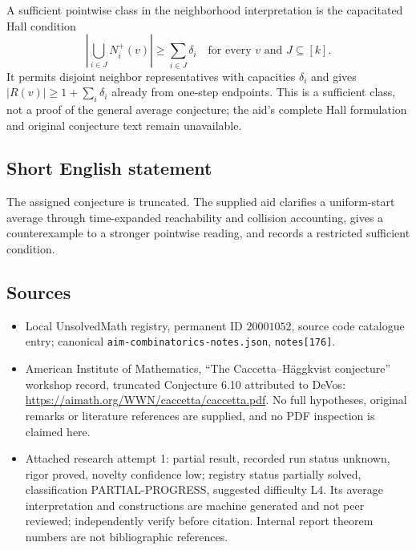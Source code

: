 \documentclass[11pt]{article}
\begin{document}
A sufficient pointwise class in the neighborhood interpretation is the capacitated Hall condition
\[
\left|\bigcup_{i\in J}N_i^+(v)\right|\ge\sum_{i\in J}\delta_i
\quad\text{for every }v\text{ and }J\subseteq[k].
\]
It permits disjoint neighbor representatives with capacities $\delta_i$ and gives $|R(v)|\ge1+\sum_i\delta_i$ already from one-step endpoints. This is a sufficient class, not a proof of the general average conjecture; the aid's complete Hall formulation and original conjecture text remain unavailable.
\subsection{Short English statement}
The assigned conjecture is truncated. The supplied aid clarifies a uniform-start average through time-expanded reachability and collision accounting, gives a counterexample to a stronger pointwise reading, and records a restricted sufficient condition.
\subsection{Sources}
\begin{itemize}
\item Local UnsolvedMath registry, permanent ID $20001052$, source code catalogue entry; canonical \texttt{aim-combinatorics-notes.json}, \texttt{notes[176]}.
\item American Institute of Mathematics, ``The Caccetta--H\"aggkvist conjecture'' workshop record, truncated Conjecture 6.10 attributed to DeVos: \url{https://aimath.org/WWN/caccetta/caccetta.pdf}. No full hypotheses, original remarks or literature references are supplied, and no PDF inspection is claimed here.
\item Attached research attempt 1: partial result, recorded run status unknown, rigor proved, novelty confidence low; registry status partially solved, classification PARTIAL-PROGRESS, suggested difficulty L4. Its average interpretation and constructions are machine generated and not peer reviewed; independently verify before citation. Internal report theorem numbers are not bibliographic references.
\end{itemize}
\end{document}
